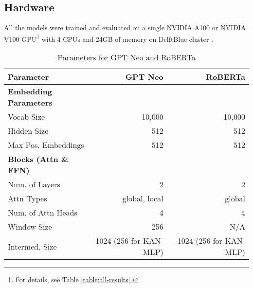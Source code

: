 \subsection{Hardware}
All the models were trained and evaluated on a single NVIDIA A100 or NVIDIA V100 GPU\footnote{For details, see Table \ref{table:all-results}.} with 4 CPUs and 24GB of memory on DelftBlue cluster \cite{DHPC2024}.



\begin{table}[h!]
    \centering
    \scriptsize %
    \setlength{\tabcolsep}{2pt} %
    \begin{tabular}{lrr}
    \toprule
    \textbf{Parameter} & \textbf{GPT Neo} & \textbf{RoBERTa} \\ \midrule
    \textbf{Embedding Parameters} & & \\ \midrule
    Vocab Size & 10,000 & 10,000 \\ \midrule
    Hidden Size & 512 & 512 \\ \midrule
    Max Pos. Embeddings & 512 & 512 \\ \midrule
    \textbf{Blocks (Attn \& FFN)} & & \\ \midrule
    Num. of Layers & 2 & 2 \\ \midrule
    Attn Types & global, local & global \\ \midrule
    Num. of Attn Heads & 4 & 4 \\ \midrule
    Window Size & 256 & N/A \\ \midrule
    Intermed. Size & 1024 (256 for KAN-MLP) & 1024 (256 for KAN-MLP) \\ \bottomrule
    \end{tabular}
    \caption{Parameters for GPT Neo and RoBERTa}
    \label{tab:Hyperparameters}
\end{table}